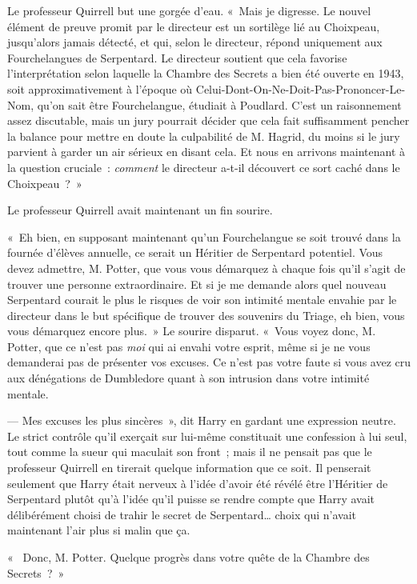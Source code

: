 Le professeur Quirrell but une gorgée d'eau.
«~Mais je digresse.
Le nouvel élément de preuve promit par le directeur est un sortilège lié au Choixpeau, jusqu'alors jamais détecté, et qui, selon le directeur, répond uniquement aux Fourchelangues de Serpentard.
Le directeur soutient que cela favorise l'interprétation selon laquelle la Chambre des Secrets a bien été ouverte en 1943, soit approximativement à l'époque où Celui-Dont-On-Ne-Doit-Pas-Prononcer-Le-Nom, qu'on sait être Fourchelangue, étudiait à Poudlard.
C'est un raisonnement assez discutable, mais un jury pourrait décider que cela fait suffisamment pencher la balance pour mettre en doute la culpabilité de M. Hagrid, du moins si le jury parvient à garder un air sérieux en disant cela.
Et nous en arrivons maintenant à la question cruciale~: \emph{comment} le directeur a-t-il découvert ce sort caché dans le Choixpeau~?~»

Le professeur Quirrell avait maintenant un fin sourire.

«~Eh bien, en supposant maintenant qu'un Fourchelangue se soit trouvé dans la fournée d'élèves annuelle, ce serait un Héritier de Serpentard potentiel.
Vous devez admettre, M. Potter, que vous vous démarquez à chaque fois qu'il s'agit de trouver une personne extraordinaire.
Et si je me demande alors quel nouveau Serpentard courait le plus le risques de voir son intimité mentale envahie par le directeur dans le but spécifique de trouver des souvenirs du Triage, eh bien, vous vous démarquez encore plus.~»
Le sourire disparut.
«~Vous voyez donc, M. Potter, que ce n'est pas \emph{moi} qui ai envahi votre esprit, même si je ne vous demanderai pas de présenter vos excuses.
Ce n'est pas votre faute si vous avez cru aux dénégations de Dumbledore quant à son intrusion dans votre intimité mentale.

--- Mes excuses les plus sincères~», dit Harry en gardant une expression neutre.
Le strict contrôle qu'il exerçait sur lui-même constituait une confession à lui seul, tout comme la sueur qui maculait son front~; mais il ne pensait pas que le professeur Quirrell en tirerait quelque information que ce soit.
Il penserait seulement que Harry était nerveux à l'idée d'avoir été révélé être l'Héritier de Serpentard plutôt qu'à l'idée qu'il puisse se rendre compte que Harry avait délibérément choisi de trahir le secret de Serpentard… choix qui n'avait maintenant l'air plus si malin que ça.

«~ Donc, M. Potter.
Quelque progrès dans votre quête de la Chambre des Secrets~?~»

